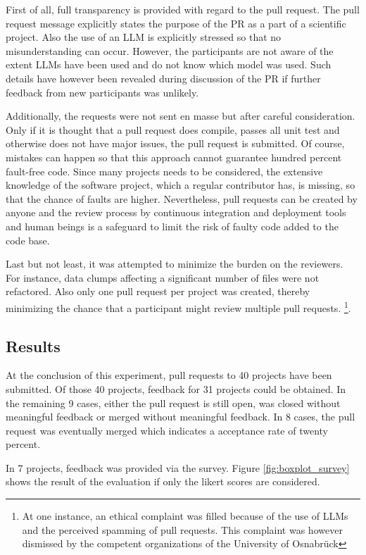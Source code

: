 First of all, full transparency is provided  with regard to the pull request. The pull request message explicitly states the purpose of the PR as a part of a scientific project. Also the use of an \ac{LLM} is explicitly stressed so that no misunderstanding can occur. However, the participants are not aware of the extent \acp{LLM} have been used and do not know which model was used. Such details have however been revealed during discussion of the PR if further feedback from new participants was unlikely.

Additionally, the requests were not sent en masse but after careful consideration. Only if it is thought that a pull request does compile, passes all unit test and otherwise does not have major issues, the pull request is submitted. Of course, mistakes can happen so that this approach cannot guarantee hundred percent fault-free code. Since many projects needs to be considered, the extensive knowledge of the software project, which a regular contributor has, is missing, so that the chance of faults are higher. Nevertheless, pull requests can be created by anyone and the review process by continuous integration and deployment tools and human beings is a safeguard to limit the risk of faulty code added to the code base. 

Last but not least, it was attempted to minimize the burden on the reviewers. For instance, data clumps affecting a significant number of files were not refactored. Also only one pull request per project was created, thereby minimizing the chance that a participant might review multiple pull requests. \footnote{At one instance, an ethical complaint was filled because of the use of \acp{LLM} and the perceived spamming of pull requests. This complaint was however dismissed by the competent organizations of the University of Osnabrück}.  


\subsection{Results}

At the conclusion of this experiment, pull requests to 40 projects have been submitted. Of those 40 projects,  feedback for 31 projects could be obtained. In the remaining 9 cases, either the pull request is still open, was closed without meaningful feedback or merged without meaningful feedback. In 8 cases, the pull request was eventually merged which indicates a acceptance rate of twenty percent. 

In 7 projects, feedback was provided via the survey. Figure \ref{fig:boxplot_survey} shows the result of the evaluation if only the likert scores are considered. 

